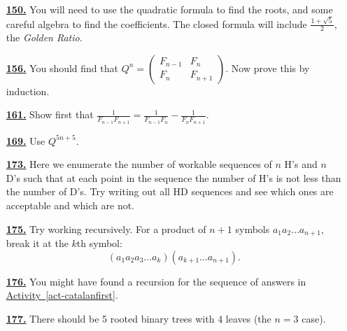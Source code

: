\documentclass[10pt,]{book}
\theoremstyle{plain}
\theoremstyle{definition}
\theoremstyle{definition}
\theoremstyle{definition}
\numberwithin{equation}{chapter}
\newcommand{\amp}{&}
\begin{document}
\begin{itemize}[itemsep=1em]
\hypertarget{a-150}{}\item[\textbf{\hyperref[act-binet]{150.}}]
\hypertarget{p-956}{}%
You will need to use the quadratic formula to find the roots, and some careful algebra to find the coefficients.  The closed formula will include \(\frac{1+\sqrt{5}}{2}\), the \emph{Golden Ratio}.%

\hypertarget{a-156}{}\item[\textbf{\hyperref[fib-matrix]{156.}}]
\hypertarget{p-969}{}%
You should find that \(Q^n = \begin{pmatrix}
F_{n - 1} \amp F_{n}\\
F_{n} \amp F_{n + 1}
\end{pmatrix}\).  Now prove this by induction.%

\hypertarget{a-161}{}\item[\textbf{\hyperref[activity-154]{161.}}]
\hypertarget{p-975}{}%
Show first that \(\frac{1}{F_{n - 1}F_{n + 1}} = \frac{1}{F_{n - 1}F_{n}} -
\frac{1}{F_{n}F_{n + 1}}\).%

\hypertarget{a-169}{}\item[\textbf{\hyperref[activity-162]{169.}}]
\hypertarget{p-984}{}%
Use \(Q^{5n + 5}\).%

\hypertarget{a-173}{}\item[\textbf{\hyperref[act-hdseq]{173.}}]
\hypertarget{p-993}{}%
Here we enumerate the number of workable sequences of \(n\) H's and \(n\) D's such that at each point in the sequence the number of H's is not less than the number of D's.  Try writing out all HD sequences and see which ones are acceptable and which are not.%

\hypertarget{a-175}{}\item[\textbf{\hyperref[act-parenthesize]{175.}}]
\hypertarget{p-999}{}%
Try working recursively.   For a product of \(n+1\) symbols \(a_{1}a_{2}\ldots a_{n+1}\), break it at the \(k\)th symbol:%
\begin{equation*}
(a_{1}a_{2}a_{3}\ldots a_{k})(a_{k + 1}\ldots a_{n+1}).
\end{equation*}
%

\hypertarget{a-176}{}\item[\textbf{\hyperref[act-traingulations]{176.}}]
\hypertarget{p-1001}{}%
You might have found a recursion for the sequence of answers in \hyperref[act-catalanfirst]{Activity~\ref{act-catalanfirst}}.%

\hypertarget{a-177}{}\item[\textbf{\hyperref[act-rootedtrees]{177.}}]
\hypertarget{p-1004}{}%
There should be 5 rooted binary trees with 4 leaves (the \(n = 3\) case).%


\end{itemize}
\end{document}
